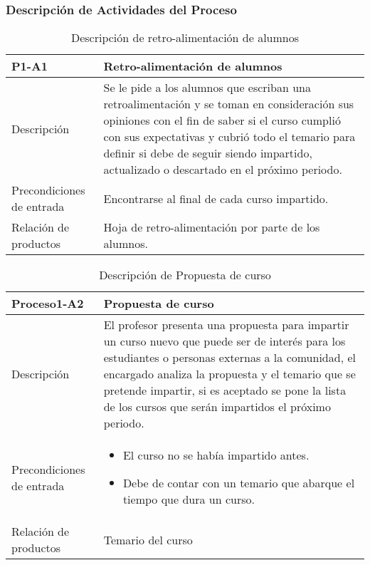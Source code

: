 \subsubsection{Descripción de Actividades del Proceso}		%
\begin{table}[H]
\centering
	\begin{tabular}{p{5cm} p{11cm}}
		\hline\hline
			\rowcolor{LightBlue2} \textbf{P1-A1} & \textbf{Retro-alimentación de alumnos}\\
		\hline\hline
			Descripción & Se le pide a los alumnos que escriban una retroalimentación y se toman en consideración sus opiniones con el fin de saber si el curso cumplió con sus expectativas y cubrió todo el temario  para definir si debe de seguir siendo impartido, actualizado o descartado en el próximo periodo.\\
		\hline
			Precondiciones de entrada & Encontrarse al final de cada curso impartido.\\					
		\hline
			Relación de productos & Hoja de retro-alimentación por parte de los alumnos.\\
		\hline
	\end{tabular}
\caption{Descripción de retro-alimentación de alumnos}
\end{table}

\begin{table}[H]
	\centering
	\begin{tabular}{p{5cm} p{11cm}}
		\hline
		\rowcolor{LightBlue2} \textbf{Proceso1-A2} & \textbf{Propuesta de curso}\\
		\hline\hline
		Descripción & El profesor presenta una propuesta para impartir un curso nuevo que puede ser de interés para los estudiantes o personas externas a la comunidad, el encargado analiza la propuesta y el temario que se pretende impartir, si es aceptado se pone la lista de los cursos que serán impartidos el próximo periodo.\\
		\hline
		Precondiciones de entrada & 	
		\begin{itemize}
			\item El curso no se había impartido antes.
			\item Debe de contar con un temario que abarque el tiempo que dura un curso.
		\end{itemize}
		 \\					
		\hline
		Relación de productos & Temario del curso\\
		\hline
	\end{tabular}
	\caption{Descripción de Propuesta de curso}
\end{table}


